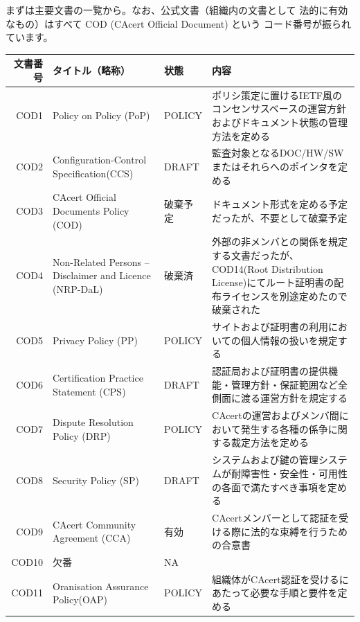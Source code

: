 \documentclass[mingoth,a4paper]{jsarticle}
\begin{document}
まずは主要文書の一覧から。なお、公式文書（組織内の文書として
法的に有効なもの）はすべて COD (CAcert Official Document) という
コード番号が振られています。

\begin{table}[H]
\begin{center}
\begin{tabular}{|r|p{10em}|l|p{20em}|}
\hline
文書番号 & タイトル（略称） & 状態 & 内容 \\ \hline
COD1 & Policy on Policy (PoP) & POLICY &
ポリシ策定に置けるIETF風のコンセンサスベースの運営方針およびドキュメント状態の管理方法を定める \\ \hline

COD2 &
Configuration-Control Specification(CCS) & DRAFT &
監査対象となるDOC/HW/SWまたはそれらへのポインタを定める \\ \hline

COD3 &
CAcert Official Documents Policy (COD) & 破棄予定 &
ドキュメント形式を定める予定だったが、不要として破棄予定 \\ \hline

COD4 &
Non-Related Persons -- Disclaimer and Licence (NRP-DaL) & 破棄済 &
外部の非メンバとの関係を規定する文書だったが、COD14(Root Distribution License)にてルート証明書の配布ライセンスを別途定めたので破棄された \\ \hline

COD5 &
Privacy Policy (PP) & POLICY &
サイトおよび証明書の利用においての個人情報の扱いを規定する \\ \hline

COD6 &
Certification Practice Statement (CPS) & DRAFT &
認証局および証明書の提供機能・管理方針・保証範囲など全側面に渡る運営方針を規定する \\ \hline

COD7 &
Dispute Resolution Policy (DRP) & POLICY &
CAcertの運営およびメンバ間において発生する各種の係争に関する裁定方法を定める \\ \hline

COD8 &
Security Policy (SP) & DRAFT &
システムおよび鍵の管理システムが耐障害性・安全性・可用性の各面で満たすべき事項を定める \\ \hline

COD9 &
CAcert Community Agreement (CCA) & 有効 &
CAcertメンバーとして認証を受ける際に法的な束縛を行うための合意書 \\ \hline

COD10 &
欠番 & NA & \\ \hline

COD11 &
Oranisation Assurance Policy(OAP) & POLICY &
組織体がCAcert認証を受けるにあたって必要な手順と要件を定める \\ \hline


\end{tabular}
\end{center}
\end{table}
\end{document}
